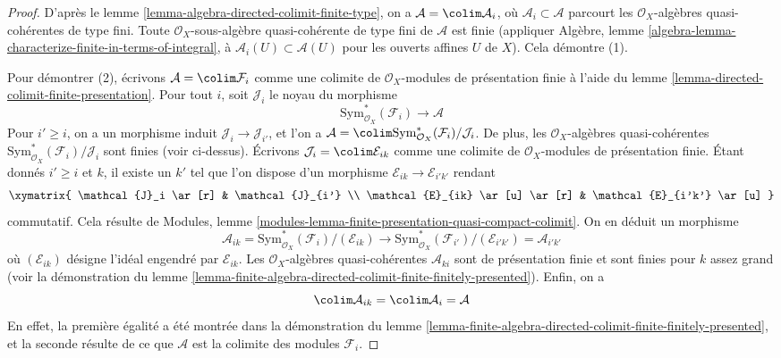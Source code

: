 \begin{proof}
D'après le lemme \ref{lemma-algebra-directed-colimit-finite-type}, on a
$\mathcal{A} = \colim \mathcal{A}_i$, où
$\mathcal{A}_i \subset \mathcal{A}$ parcourt les
$\mathcal{O}_X$-algèbres quasi-cohérentes de type fini.
Toute $\mathcal{O}_X$-sous-algèbre quasi-cohérente de type fini
de $\mathcal{A}$ est finie (appliquer Algèbre, lemme
\ref{algebra-lemma-characterize-finite-in-terms-of-integral},
à $\mathcal{A}_i(U) \subset \mathcal{A}(U)$ pour les ouverts affines $U$
de $X$). Cela démontre (1).

\medskip\noindent
Pour démontrer (2), écrivons $\mathcal{A} = \colim \mathcal{F}_i$
comme une colimite de $\mathcal{O}_X$-modules de présentation finie à l'aide du
lemme \ref{lemma-directed-colimit-finite-presentation}.
Pour tout $i$, soit $\mathcal{J}_i$ le noyau du morphisme
$$
\text{Sym}^*_{\mathcal{O}_X}(\mathcal{F}_i) \longrightarrow \mathcal{A}
$$
Pour $i' \geq i$, on a un morphisme induit $\mathcal{J}_i \to \mathcal{J}_{i'}$,
et l'on a $\mathcal{A} =
\colim \text{Sym}^*_{\mathcal{O}_X}(\mathcal{F}_i)/\mathcal{J}_i$.
De plus, les $\mathcal{O}_X$-algèbres quasi-cohérentes
$\text{Sym}^*_{\mathcal{O}_X}(\mathcal{F}_i)/\mathcal{J}_i$
sont finies (voir ci-dessus). Écrivons $\mathcal{J}_i = \colim \mathcal{E}_{ik}$
comme une colimite de $\mathcal{O}_X$-modules de présentation finie.
Étant donnés $i' \geq i$ et $k$, il existe un $k'$ tel que l'on
dispose d'un morphisme $\mathcal{E}_{ik} \to \mathcal{E}_{i'k'}$
rendant
$$
\xymatrix{
\mathcal{J}_i \ar[r] & \mathcal{J}_{i'} \\
\mathcal{E}_{ik} \ar[u] \ar[r] & \mathcal{E}_{i'k'} \ar[u]
}
$$
commutatif. Cela résulte de
Modules, lemme \ref{modules-lemma-finite-presentation-quasi-compact-colimit}.
On en déduit un morphisme
$$
\mathcal{A}_{ik} =
\text{Sym}^*_{\mathcal{O}_X}(\mathcal{F}_i)/(\mathcal{E}_{ik})
\longrightarrow
\text{Sym}^*_{\mathcal{O}_X}(\mathcal{F}_{i'})/(\mathcal{E}_{i'k'}) =
\mathcal{A}_{i'k'}
$$
où $(\mathcal{E}_{ik})$ désigne l'idéal engendré par $\mathcal{E}_{ik}$.
Les $\mathcal{O}_X$-algèbres quasi-cohérentes $\mathcal{A}_{ki}$
sont de présentation finie et sont finies pour $k$ assez grand
(voir la démonstration du
lemme \ref{lemma-finite-algebra-directed-colimit-finite-finitely-presented}).
Enfin, on a
$$
\colim \mathcal{A}_{ik} = \colim \mathcal{A}_i = \mathcal{A}
$$
En effet, la première égalité a été montrée dans la démonstration du
lemme \ref{lemma-finite-algebra-directed-colimit-finite-finitely-presented},
et la seconde résulte de ce que $\mathcal{A}$ est la colimite des
modules $\mathcal{F}_i$.
\end{proof}
